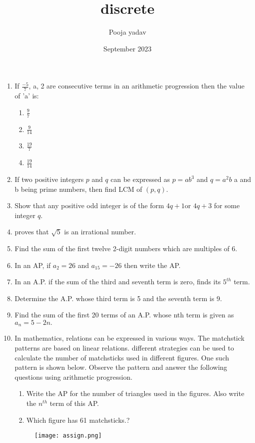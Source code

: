 \documentclass{article}
\title{discrete}
\author{Pooja yadav}
\date{September 2023}
\begin{document}
\maketitle

\begin{enumerate}
    



\item If   $\frac{-5}{7}$, a, 2 are consecutive terms in an arithmetic progression then the value of 'a' is:
   \begin{enumerate}
    
    \item $\frac{9}{7}$
    \item $\frac{9}{14}$
    \item $\frac{19}{7}$
    \item $\frac{19}{14}$
\end{enumerate}

 \item If two positive integers $p$ and $q$ can be expressed as $p = ab^3$ and $q = a^2b$ a and b being prime numbers, then find LCM of $(p,q)$.

\item Show that any positive odd integer is of the form $4q + 1 $or $4q + 3$ for some integer $q$.
\item proves that $\sqrt{5}$ is an irrational number.
\item Find the sum of the first twelve 2-digit numbers which are multiples of 6.   
    
\item In an AP, if $a_2 = 26$ and $a_{15} = -26$ then write the AP. 
 \item In an A.P. if the sum of the third and seventh term is zero, finds its $5^{th}$
    term.
\item Determine the A.P. whose third term is 5 and the seventh term is 9.
\item Find the sum of the first 20 terms of an A.P. whose nth term is given as $a_n= 5 - 2n.$
\item In mathematics, relations can be expressed in various ways. The matchstick patterns are based on linear relations. different strategies can be used to calculate the number of matchsticks used in different figures.
 One such pattern is shown below. Observe the pattern and answer the following questions using arithmetic progression.
  

\begin{enumerate}
\item Write the AP for the number of triangles used in the figures. Also
write the $n^{th}$ term of this AP.
\item Which figure has 61 matchsticks.? 
\end{enumerate}
\begin{figure}
\centering
\texttt{[image: assign.png]}
\caption{}
\end{figure} 




\end{enumerate}
\end{document}
